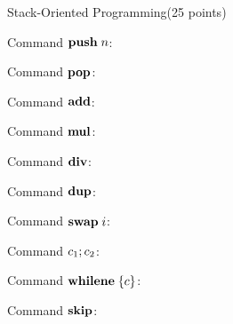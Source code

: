 \documentclass{article}
\begin{document}
\begin{question}{Stack-Oriented Programming}{(25 points)}
  \begin{subquestion}
    \begin{subsubquestion}
      Command $\mathbf{push}\;n$: 
    \end{subsubquestion}
    \begin{subsubquestion}
      Command $\mathbf{pop}$: 
    \end{subsubquestion}
    \begin{subsubquestion}
      Command $\mathbf{add}$: 
    \end{subsubquestion}
    \begin{subsubquestion}
      Command $\mathbf{mul}$: 
    \end{subsubquestion}
    \begin{subsubquestion}
      Command $\mathbf{div}$: 
    \end{subsubquestion}
    \begin{subsubquestion}
      Command $\mathbf{dup}$: 
    \end{subsubquestion}
    \begin{subsubquestion}
      Command $\mathbf{swap}\;{i}$: 
    \end{subsubquestion}
    \begin{subsubquestion}
      Command $c_1; c_2$: 
    \end{subsubquestion}
    \begin{subsubquestion}
      Command $\mathbf{whilene}\;\{c\}$: 
    \end{subsubquestion}
    \begin{subsubquestion}
      Command $\mathbf{skip}$: 
    \end{subsubquestion}

  \end{subquestion}

  \begin{subquestion}
  \end{subquestion}
  
  \begin{subquestion}
  \end{subquestion}
  
  \begin{subquestion}
  \end{subquestion}
  
  \begin{subquestion}
  \end{subquestion}
  
    
\end{question}
\end{document}
